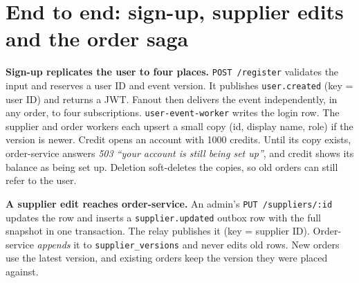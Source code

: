 \documentclass[11pt,a4paper]{article}
\newcommand{\code}[1]{\nolinkurl{#1}}
\begin{document}
\section{End to end: sign-up, supplier edits and the order saga}

\textbf{Sign-up replicates the user to four places.} \code{POST /register} validates the input
and reserves a user ID and event version. It publishes \code{user.created} (key = user ID) and
returns a JWT. Fanout then delivers the event independently, in any order, to four subscriptions.
\code{user-event-worker} writes the login row. The supplier and order workers each upsert a small
copy (id, display name, role) if the version is newer. Credit opens an account with 1000
credits. Until its copy exists, order-service answers \emph{503 ``your account is still being
set up''}, and credit shows its balance as being set up. Deletion soft-deletes the copies, so old
orders can still refer to the user.

\textbf{A supplier edit reaches order-service.} An admin's \code{PUT /suppliers/:id} updates the
row and inserts a \code{supplier.updated} outbox row with the full snapshot in one transaction.
The relay publishes it (key = supplier ID). Order-service \emph{appends} it to
\code{supplier_versions} and never edits old rows. New orders use the latest version, and
existing orders keep the version they were placed against.
\end{document}
